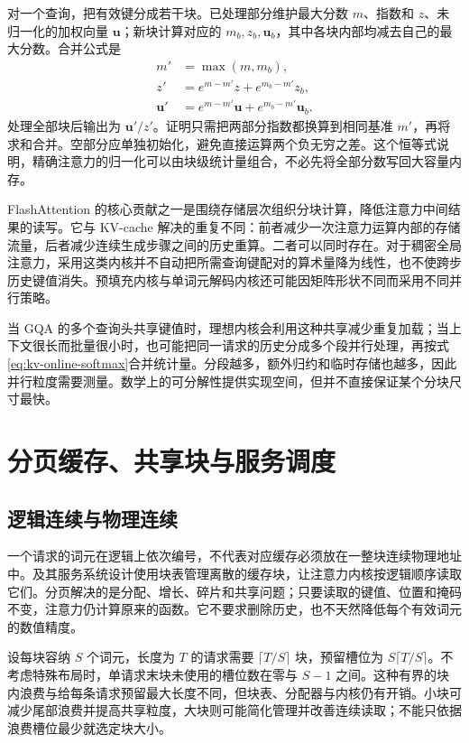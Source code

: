 \documentclass[UTF8,12pt,a4paper,fontset=fandol]{ctexart}
\begin{document}
对一个查询，把有效键分成若干块。已处理部分维护最大分数 $m$、指数和 $z$、未归一化的加权向量 $\mathbf u$；新块计算对应的 $m_b,z_b,\mathbf u_b$，其中各块内部均减去自己的最大分数。合并公式是
\begin{equation}
 \begin{aligned}
 m'&=\max(m,m_b),\\
 z'&=e^{m-m'}z+e^{m_b-m'}z_b,\\
 \mathbf u'&=e^{m-m'}\mathbf u+e^{m_b-m'}\mathbf u_b.
 \end{aligned}
 \label{eq:kv-online-softmax}
\end{equation}
处理全部块后输出为 $\mathbf u'/z'$。证明只需把两部分指数都换算到相同基准 $m'$，再将求和合并。空部分应单独初始化，避免直接运算两个负无穷之差。这个恒等式说明，精确注意力的归一化可以由块级统计量组合，不必先将全部分数写回大容量内存。

FlashAttention 的核心贡献之一是围绕存储层次组织分块计算，降低注意力中间结果的读写\cite{flash}。它与 KV-cache 解决的重复不同：前者减少一次注意力运算内部的存储流量，后者减少连续生成步骤之间的历史重算。二者可以同时存在。对于稠密全局注意力，采用这类内核并不自动把所需查询键配对的算术量降为线性，也不使跨步历史键值消失。预填充内核与单词元解码内核还可能因矩阵形状不同而采用不同并行策略。

当 GQA 的多个查询头共享键值时，理想内核会利用这种共享减少重复加载；当上下文很长而批量很小时，也可能把同一请求的历史分成多个段并行处理，再按式\eqref{eq:kv-online-softmax}合并统计量。分段越多，额外归约和临时存储也越多，因此并行粒度需要测量。数学上的可分解性提供实现空间，但并不直接保证某个分块尺寸最快。

\section{分页缓存、共享块与服务调度}
\label{sec:kv-paging}

\subsection{逻辑连续与物理连续}

一个请求的词元在逻辑上依次编号，不代表对应缓存必须放在一整块连续物理地址中。及其服务系统设计使用块表管理离散的缓存块，让注意力内核按逻辑顺序读取它们\cite{paged}。分页解决的是分配、增长、碎片和共享问题；只要读取的键值、位置和掩码不变，注意力仍计算原来的函数。它不要求删除历史，也不天然降低每个有效词元的数值精度。

设每块容纳 $S$ 个词元，长度为 $T$ 的请求需要 $\lceil T/S\rceil$ 块，预留槽位为 $S\lceil T/S\rceil$。不考虑特殊布局时，单请求末块未使用的槽位数在零与 $S-1$ 之间。这种有界的块内浪费与给每条请求预留最大长度不同，但块表、分配器与内核仍有开销。小块可减少尾部浪费并提高共享粒度，大块则可能简化管理并改善连续读取；不能只依据浪费槽位最少就选定块大小。
\end{document}
